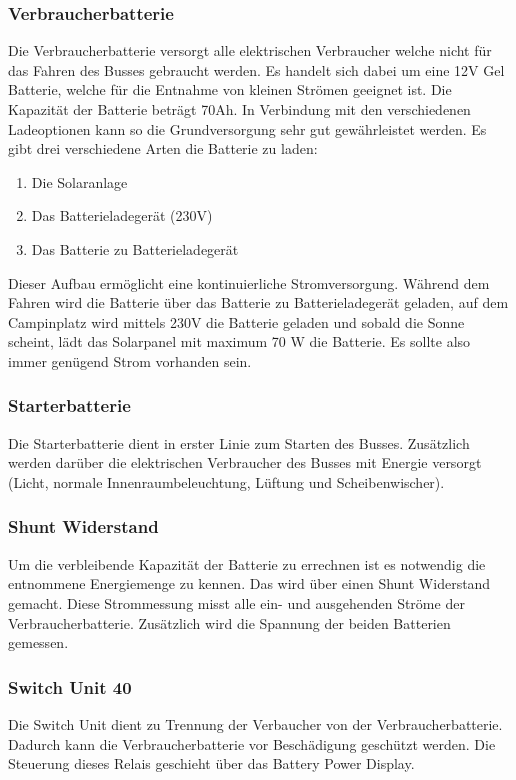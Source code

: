 \subsubsection{Verbraucherbatterie}
Die Verbraucherbatterie versorgt alle elektrischen Verbraucher welche nicht für das Fahren des Busses gebraucht werden.
Es handelt sich dabei um eine 12V Gel Batterie, welche für die Entnahme von kleinen Strömen geeignet ist.
Die Kapazität der Batterie beträgt 70Ah.
In Verbindung mit den verschiedenen Ladeoptionen kann so die Grundversorgung sehr gut gewährleistet werden.
Es gibt drei verschiedene Arten die Batterie zu laden:

\begin{enumerate}
\item Die Solaranlage 
\item Das Batterieladegerät (230V)
\item Das Batterie zu Batterieladegerät
\end{enumerate}

Dieser Aufbau ermöglicht eine kontinuierliche Stromversorgung.
Während dem Fahren wird die Batterie über das Batterie zu Batterieladegerät geladen, auf dem Campinplatz wird mittels 230V die Batterie geladen und sobald die Sonne scheint, lädt das Solarpanel mit maximum 70 W die Batterie. 
Es sollte also immer genügend Strom vorhanden sein.

\subsubsection{Starterbatterie}
Die Starterbatterie dient in erster Linie zum Starten des Busses.
Zusätzlich werden darüber die elektrischen Verbraucher des Busses mit Energie versorgt (Licht, normale Innenraumbeleuchtung, Lüftung und Scheibenwischer).

\subsubsection{Shunt Widerstand}
Um die verbleibende Kapazität der Batterie zu errechnen ist es notwendig die entnommene Energiemenge zu kennen.
Das wird über einen Shunt Widerstand gemacht.
Diese Strommessung misst alle ein- und ausgehenden Ströme der Verbraucherbatterie.
Zusätzlich wird die Spannung der beiden Batterien gemessen. 

\subsubsection{Switch Unit 40}
Die Switch Unit dient zu Trennung der Verbaucher von der Verbraucherbatterie.
Dadurch kann die Verbraucherbatterie vor Beschädigung geschützt werden.
Die Steuerung dieses Relais geschieht über das Battery Power Display.

